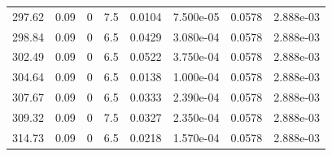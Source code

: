 \documentclass[preview]{standalone}
\begin{document}
{{{{\begin{tabular}{L{1.2cm}C{1.2cm} C{0.3cm}C{0.5cm} C{1.4cm}C{1.4cm} C{1.4cm}C{1.4cm}}
  297.62  &  0.09  & 0     & 7.5 &  0.0104  & 7.500e-05  & 0.0578 &  2.888e-03   \\ 
  298.84  &  0.09  & 0     & 6.5 &  0.0429  & 3.080e-04  & 0.0578 &  2.888e-03   \\ 
  302.49  &  0.09  & 0     & 6.5 &  0.0522  & 3.750e-04  & 0.0578 &  2.888e-03   \\ 
  304.64  &  0.09  & 0     & 6.5 &  0.0138  & 1.000e-04  & 0.0578 &  2.888e-03   \\ 
  307.67  &  0.09  & 0     & 6.5 &  0.0333  & 2.390e-04  & 0.0578 &  2.888e-03   \\ 
  309.32  &  0.09  & 0     & 7.5 &  0.0327  & 2.350e-04  & 0.0578 &  2.888e-03   \\ 
  314.73  &  0.09  & 0     & 6.5 &  0.0218  & 1.570e-04  & 0.0578 &  2.888e-03   \\ 
\hline 
\end{tabular} 

}}}}
\end{document}
